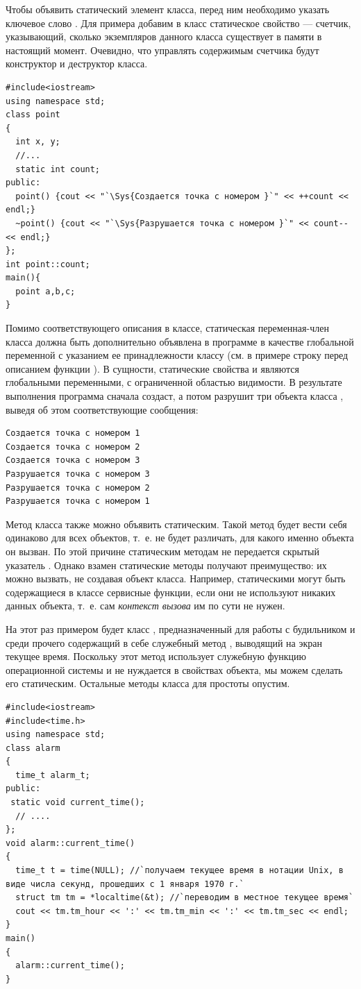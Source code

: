 Чтобы объявить статический элемент класса, перед ним необходимо указать ключевое слово . Для
примера добавим в класс  статическое свойство  --- счетчик,
указывающий, сколько экземпляров данного класса существует в памяти в настоящий момент. Очевидно, что управлять
содержимым счетчика будут конструктор и деструктор класса.
\begin{lstlisting}
#include<iostream>
using namespace std;
class point 
{
  int x, y;
  //...
  static int count;
public:
  point() {cout << "`\Sys{Создается точка с номером }`" << ++count << endl;}
  ~point() {cout << "`\Sys{Разрушается точка с номером }`" << count-- << endl;}
};
int point::count;
main(){
  point a,b,c;
}
\end{lstlisting}

Помимо соответствующего описания в классе, статическая переменная-член класса должна быть дополнительно объявлена в
программе в качестве глобальной переменной с указанием ее принадлежности классу (см. в примере строку перед описанием
функции ). В сущности, статические свойства и являются глобальными переменными, с
ограниченной областью видимости. В результате выполнения программа сначала создаст, а потом разрушит три объекта класса
, выведя об этом соответствующие сообщения:
\begin{verbatim}
Создается точка с номером 1 
Создается точка с номером 2 
Создается точка с номером 3 
Разрушается точка с номером 3 
Разрушается точка с номером 2 
Разрушается точка с номером 1
\end{verbatim}

Метод класса также можно объявить статическим. Такой метод будет вести себя одинаково для всех объектов, т.~е. не будет
различать, для какого именно объекта он вызван. По этой причине статическим  методам не передается скрытый указатель
. Однако взамен статические методы получают преимущество: их можно вызвать, не создавая
объект класса. Например, статическими могут быть содержащиеся в классе сервисные функции, если они не используют
никаких данных объекта, т.~е. сам \emph{контекст вызова} им по сути не нужен. 

На этот раз примером будет класс , предназначенный для работы с  будильником и среди прочего
содержащий в себе служебный метод , выводящий на экран текущее время. Поскольку
этот метод использует служебную функцию операционной системы и не нуждается в свойствах объекта, мы можем сделать его
статическим. Остальные методы класса для простоты опустим.
\begin{lstlisting}
#include<iostream>
#include<time.h>
using namespace std;
class alarm 
{
  time_t alarm_t;
public:
 static void current_time();
  // ....
};
void alarm::current_time() 
{
  time_t t = time(NULL); //`получаем текущее время в нотации Unix, в виде числа секунд, прошедших с 1 января 1970 г.`
  struct tm tm = *localtime(&t); //`переводим в местное текущее время`
  cout << tm.tm_hour << ':' << tm.tm_min << ':' << tm.tm_sec << endl;
}
main() 
{
  alarm::current_time();
}
\end{lstlisting}

